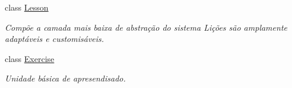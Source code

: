 \begin{DoxyCompactItemize}
class \hyperlink{classELO_1_1EntityUnit_1_1Lesson}{Lesson}
\begin{DoxyCompactList}\small\item\em Compõe a camada mais baixa de abstração do sistema Lições são amplamente adaptáveis e customisáveis. \end{DoxyCompactList}\item 
class \hyperlink{classELO_1_1EntityUnit_1_1Exercise}{Exercise}
\begin{DoxyCompactList}\small\item\em Unidade básica de apresendisado. \end{DoxyCompactList}\end{DoxyCompactItemize}
